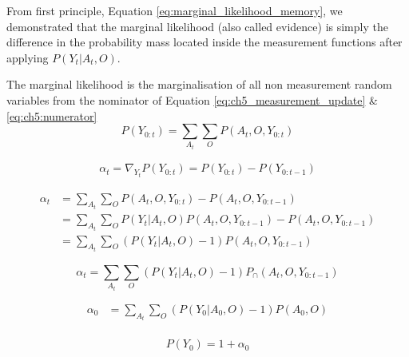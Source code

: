 From first principle, Equation \ref{eq:marginal_likelihood_memory}, we demonstrated that 
the marginal likelihood (also called evidence) is simply the difference
in the probability mass located inside the measurement functions after applying $P(Y_t|A_t,O)$.

The marginal likelihood is the marginalisation of all non measurement random variables from 
the nominator of Equation \ref{eq:ch5_measurement_update} \& \ref{eq:ch5:numerator}
\begin{equation}\label{eq:ch5:numerator}
 P(Y_{0:t}) = \sum\limits_{A_t}\sum\limits_{O} P(A_t,O,Y_{0:t}) \label{eq:marginal_likelihood_memory}   
\end{equation}
 
\begin{align}
  \alpha_t = \nabla_{Y_t}P(Y_{0:t}) =  P(Y_{0:t}) - P(Y_{0:t-1})
\end{align}

\begin{align}
 \alpha_t  &= \sum\limits_{A_t}\sum\limits_{O} P(A_t,O,Y_{0:t}) - P(A_t,O,Y_{0:t-1})  \\
	   &= \sum\limits_{A_t}\sum\limits_{O} P(Y_t|A_t,O)P(A_t,O,Y_{0:t-1}) - P(A_t,O,Y_{0:t-1}) \\
	   &= \sum\limits_{A_t}\sum\limits_{O} (P(Y_t|A_t,O) - 1)P(A_t,O,Y_{0:t-1})
\end{align}

\begin{equation}
 \alpha_t = \sum\limits_{A_t}\sum\limits_{O} (P(Y_t|A_t,O) - 1)P_{\cap}(A_t,O,Y_{0:t-1})
\end{equation}



\begin{align}
 \alpha_0 &= \sum\limits_{A_t}\sum\limits_{O} (P(Y_0|A_0,O) - 1)P(A_0,O)  \\
\end{align}

\begin{equation}
 P(Y_0) = 1 + \alpha_0
\end{equation}




